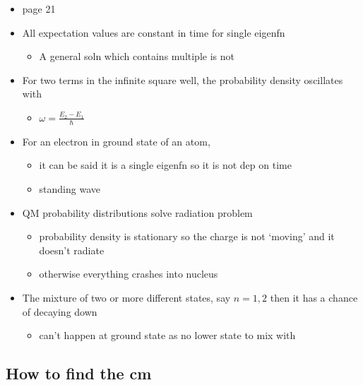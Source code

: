 \documentclass[a4paper,11pt,normalem]{article}
\begin{document}
\begin{itemize}
\item
  page 21
\item
  All expectation values are constant in time for single eigenfn
  \begin{itemize}
  \item
    A general soln which contains multiple is not
  \end{itemize}
\item
  For two terms in the infinite square well, the probability density
  oscillates with
  \begin{itemize}
  \item
    \(\omega = \frac{E_2 - E_1}{\hbar}\)
  \end{itemize}
\item
  For an electron in ground state of an atom,
  \begin{itemize}
  \item
    it can be said it is a single eigenfn so it is not dep on time
  \item
    standing wave
  \end{itemize}
\item
  QM probability distributions solve radiation problem
  \begin{itemize}
  \item
    probability density is stationary so the charge is not `moving' and
    it doesn't radiate
  \item
    otherwise everything crashes into nucleus
  \end{itemize}
\item
  The mixture of two or more different states, say \(n = 1, 2\) then it
  has a chance of decaying down
  \begin{itemize}
  \item
    can't happen at ground state as no lower state to mix with
  \end{itemize}
\end{itemize}

\subsection{How to find the cm}\label{how-to-find-the-cm}
\end{document}
